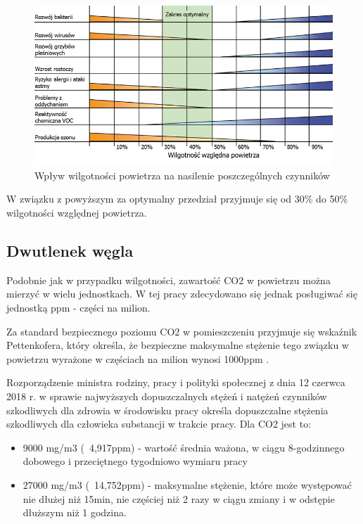 \begin{figure}[H]
    \includegraphics[width=\textwidth]{zdj/wilgotnosc_powietrza_w_pomieszczeniach.jpg}
    \caption{Wpływ wilgotności powietrza na nasilenie poszczególnych czynników}
\end{figure}

W związku z powyższym za optymalny przedział przyjmuje się od 30\% do 50\% wilgotności względnej 
powietrza.

\subsection{Dwutlenek węgla}

Podobnie jak w przypadku wilgotności, zawartość CO2 w powietrzu można mierzyć w wielu jednostkach. 
W tej pracy zdecydowano się jednak posługiwać się jednostką ppm - części na milion.

Za standard bezpiecznego poziomu CO2 w pomieszczeniu przyjmuje się wskaźnik Pettenkofera, który określa, 
że bezpieczne maksymalne stężenie tego związku w powietrzu wyrażone w częściach na milion wynosi 1000ppm \cite{pettenhofer}.

Rozporządzenie ministra rodziny, pracy i polityki społecznej z dnia 12 czerwca 2018 r. w sprawie 
najwyższych dopuszczalnych stężeń i natężeń czynników szkodliwych dla zdrowia w środowisku \cite{min-stezenia} pracy określa 
dopuszczalne stężenia szkodliwych dla człowieka substancji w trakcie pracy. Dla CO2 jest to:

\begin{itemize}
    \item 9000 mg/m3 (~4,917ppm) - wartość średnia ważona, w ciągu 8-godzinnego dobowego i przeciętnego tygodniowo wymiaru pracy
    \item 27000 mg/m3 (~14,752ppm) - maksymalne stężenie, które może występować nie dłużej niż 15min, nie częściej niż 2 razy w ciągu zmiany i w odstępie dłuższym niż 1 godzina.
\end{itemize}

